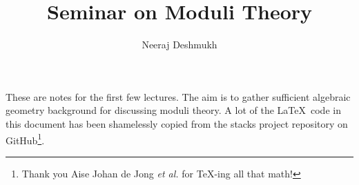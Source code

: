 \documentclass[11pt]{amsart}
\makeatletter
\renewcommand\section{\@startsection {section}{1}{\z@}%
	{-3.5ex \@plus -1ex \@minus -.2ex}%
	{2.3ex \@plus.2ex}%
	{\normalfont\scshape\center}}
\def\subtitle#1{\gdef\@subtitle{#1}}
\def\@subtitle{}
\newcommand{\sO}{{\mathcal O}}
\renewcommand{\P}{{\mathbb P}}
\theoremstyle{definition}
\makeatother
\begin{document}
\title{Seminar on Moduli Theory}
\subtitle{\today}
\author{Neeraj Deshmukh}

\maketitle


These are notes for the first few lectures. The aim is to gather sufficient algebraic geometry background for discussing moduli theory. A lot of the \LaTeX\, code in this document has been shamelessly copied from the stacks project repository on GitHub\footnote{Thank you Aise Johan de Jong \textit{et al.} for TeX-ing all that math!}.

\begin{comment}
\section{Plan}

One way to go to through these sessions is go recall theory of schemes (at level of things in Hartshorne chapter two), by doing a beeline through all the definitions, properties, etc. However, I feel since the point of doing this exercise is to become more comfortable in working with scheme, we will just do lots of examples instead. By this, I mean we will just to prove some things in very concrete situations. This will help you build a concrete picture of the generalities.

List of some things to discuss (just do lots of examples):

\begin{enumerate}
	\item Definition of a scheme.
	\item Say affine communication lemma \textit{stress this!}
	\item examples
	\begin{enumerate}
		\item $\P^n$ and it sheaf theory! This already clarifies the $\sO(n)$'s
	\end{enumerate}
\end{enumerate}



\end{comment}
\end{document}
